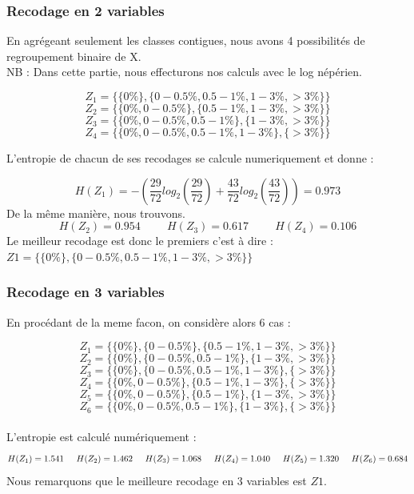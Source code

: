 \documentclass{article}
\begin{document}
\subsubsection{Recodage en 2 variables}

En agrégeant seulement les classes contigues, nous avons 4 possibilités de regroupement binaire de 
X.
\\
 NB : Dans cette partie, nous effecturons nos calculs avec le log népérien.


\[
Z_1 =\{ \{0 \% \} , \{0 - 0.5 \% ,0.5-1 \% ,1-3 \% ,>3 \% \} \}  
\]
\[
Z_2 =\{ \{0 \% , 0 - 0.5 \%  \} , \{0.5-1 \% ,1-3 \% ,>3 \% \} \}
\]
\[
Z_3 =\{ \{0 \%, 0 - 0.5 \% ,0.5-1 \%  \} , \{1-3 \% ,>3 \% \} \}
\]
\[
Z_4 =\{ \{0 \% , 0 - 0.5 \% ,0.5-1 \% ,1-3 \% \} , \{>3 \% \} \}
\]


L'entropie de chacun de ses recodages se calcule numeriquement et donne :

\[
H(Z_1) = -\left(\frac{29}{72}log_2(\frac{29}{72})+\frac{43}{72}log_2(\frac{43}{72})\right) = 0.973
\]
De la même manière, nous trouvons.
\[
H(Z_2) = 0.954 \hspace{1cm} H(Z_3) = 0.617 \hspace{1cm} H(Z_4) = 0.106
\]
Le meilleur recodage est donc le premiers c'est à dire :
$Z1 =\{ \{0 \% \} , \{0 - 0.5 \% ,0.5-1 \% ,1-3 \% ,>3 \% \} \}$


\subsubsection{Recodage en 3 variables}

En procédant de la meme facon, on considère alors 6 cas :

\[
Z_1 =\{ \{0 \% \} , \{0 - 0.5 \%\} ,\{0.5-1 \% ,1-3 \% ,>3 \% \} \}  
\]
\[
  Z_2 =\{ \{0 \% \} , \{0 - 0.5\%, 0.5-1 \% \} ,\{1-3 \% ,>3 \% \} \}
\]
\[
  Z_3 =\{ \{0 \% \} , \{0 - 0.5\%, 0.5-1 \% ,1-3 \%  \} ,\{>3 \% \} \}
\]
\[
  Z_4 =\{ \{0 \%, 0 - 0.5\%\} , \{ 0.5-1 \% ,1-3 \%  \} ,\{>3 \% \} \}
\]
\[
  Z_5 =\{ \{0 \%, 0 - 0.5\%\} , \{ 0.5-1 \% \} ,\{1-3 \% , >3 \% \} \}
\]
\[
  Z_6 =\{ \{0 \%, 0 - 0.5\%,  0.5-1 \% \} , \{1-3 \%  \} ,\{>3 \% \} \}
\]
\\
L'entropie est calculé numériquement :
\[
H(Z_1) = 1.541 \hspace{0.5cm} H(Z_2) = 1.462 \hspace{0.5cm} H(Z_3) = 1.068 \hspace{0.5cm} H(Z_4) = 1.040 \hspace{0,5cm} H(Z_5) = 1.320 \hspace{0,5 cm} H(Z_6) = 0.684
\]
Nous remarquons que le meilleure recodage en 3 variables est $Z1$.
\end{document}
